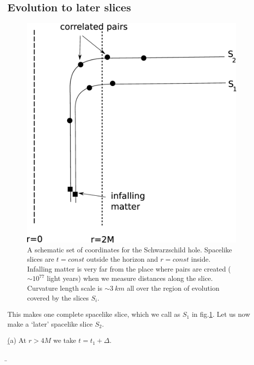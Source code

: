 \documentclass[12pt]{article}
\begin{document}
\subsection{Evolution to later slices}

\begin{figure}[htbp]
\begin{center}
\includegraphics[scale=.18]{ftwo.eps}
\caption{{A schematic set of coordinates for the Schwarzschild hole. Spacelike slices are $t=const$ outside the horizon and $r=const$ inside. Infalling matter is very far from the place where pairs are created ($\sim 10^{77}$ light years) when we measure distances along the slice. Curvature length scale is $\sim 3 ~km$ all over the region of evolution covered by the slices $S_i$.}}
\label{ftwo}
\end{center}
\end{figure}


This makes one complete spacelike slice, which we call as ${ S}_1$ in fig.\ref{ftwo}. Let us now make a   `later' spacelike slice ${ S}_2$.

\b

(a)  At  $r>4M$  we take $t=t_1+\Delta$. 

\b
\end{document}
